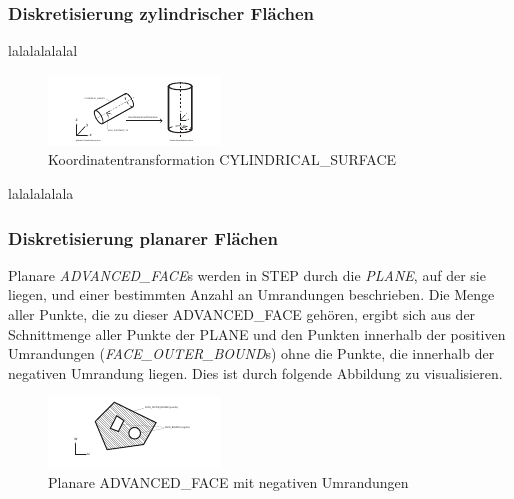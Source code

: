 \subsubsection{Diskretisierung zylindrischer Flächen}

lalalalalalal

\begin{figure}[h]
	\centering
	
	\includegraphics[width=0.7\linewidth]{img/trafozylinder.pdf}
	
	\caption{Koordinatentransformation CYLINDRICAL\_SURFACE}
	\label{fig:trafozylinder}
	
\end{figure}

lalalalalala

\subsubsection{Diskretisierung planarer Flächen}

Planare \textit{ADVANCED\_FACE}s werden in STEP durch die \textit{PLANE}, auf der sie liegen, und einer bestimmten Anzahl an Umrandungen beschrieben. Die Menge aller Punkte, die zu dieser ADVANCED\_FACE gehören, ergibt sich aus der Schnittmenge aller Punkte der PLANE und den Punkten innerhalb der positiven Umrandungen (\textit{FACE\_OUTER\_BOUND}s) ohne die Punkte, die innerhalb der negativen Umrandung liegen. 
Dies ist durch folgende Abbildung zu visualisieren.

\begin{figure}[h]
	\centering
	
	\includegraphics[width=0.7\linewidth]{img/posnegbounds.pdf}
	
	\caption{Planare ADVANCED\_FACE mit negativen Umrandungen}
	\label{fig:posnegbounds}
	
\end{figure}

